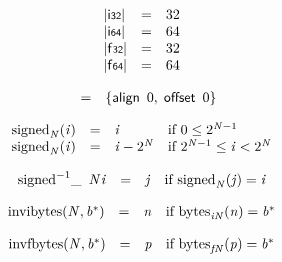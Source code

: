 $$
\begin{array}{@{}lcl@{}l@{}}
{|\mathsf{i{\scriptstyle32}}|} &=& 32 &  \\
{|\mathsf{i{\scriptstyle64}}|} &=& 64 &  \\
{|\mathsf{f{\scriptstyle32}}|} &=& 32 &  \\
{|\mathsf{f{\scriptstyle64}}|} &=& 64 &  \\
\end{array}
$$

\vspace{1ex}

\vspace{1ex}

$$
\begin{array}{@{}lcl@{}l@{}}
 &=& \{ \begin{array}[t]{@{}l@{}}
\mathsf{align}~\,0,\; \mathsf{offset}~\,0 \}\end{array} &  \\
\end{array}
$$

\vspace{1ex}

$$
\begin{array}{@{}lcl@{}l@{}}
{{\mathrm{signed}}}_{{\mathit{N}}}({\mathit{i}}) &=& {\mathit{i}} &\quad
  \mbox{if}~0 \leq {2^{{\mathit{N}} - 1}} \\
{{\mathrm{signed}}}_{{\mathit{N}}}({\mathit{i}}) &=& {\mathit{i}} - {2^{{\mathit{N}}}} &\quad
  \mbox{if}~{2^{{\mathit{N}} - 1}} \leq {\mathit{i}} < {2^{{\mathit{N}}}} \\
\end{array}
$$

$$
\begin{array}{@{}lcl@{}l@{}}
{{{{\mathrm{signed}}^{{-1}}}}{\mathsf{\_}}~\,{\mathit{N}}}{{{\mathit{i}}}} &=& {\mathit{j}} &\quad
  \mbox{if}~{{\mathrm{signed}}}_{{\mathit{N}}}({\mathit{j}}) = {{\mathit{i}}} \\
\end{array}
$$

\vspace{1ex}

$$
\begin{array}{@{}lcl@{}l@{}}
{\mathrm{invibytes}}({\mathit{N}}, {{\mathit{b}}^\ast}) &=& {\mathit{n}} &\quad
  \mbox{if}~{{\mathrm{bytes}}}_{{{\mathit{i}}}{{\mathit{N}}}}({\mathit{n}}) = {{\mathit{b}}^\ast} \\
\end{array}
$$

$$
\begin{array}{@{}lcl@{}l@{}}
{\mathrm{invfbytes}}({\mathit{N}}, {{\mathit{b}}^\ast}) &=& {\mathit{p}} &\quad
  \mbox{if}~{{\mathrm{bytes}}}_{{{\mathit{f}}}{{\mathit{N}}}}({\mathit{p}}) = {{\mathit{b}}^\ast} \\
\end{array}
$$

